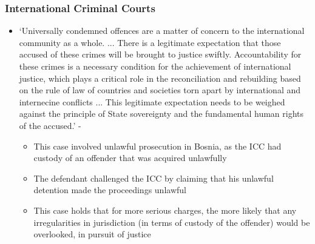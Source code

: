 \subsubsection{International Criminal Courts}
\begin{itemize}
    \item `Universally condemned offences are a matter of concern to the international community as a whole. ... There is a legitimate expectation that those accused of these crimes will be brought to justice swiftly. Accountability for these crimes is a necessary condition for the achievement of international justice, which plays a critical role in the reconciliation and rebuilding based on the rule of law of countries and societies torn apart by international and internecine conflicts ... This legitimate expectation needs to be weighed against the principle of State sovereignty and the fundamental human rights of the accused.' - 
    \begin{itemize}
        \item This case involved unlawful prosecution in Bosnia, as the ICC had custody of an offender that was acquired unlawfully
        \item The defendant challenged the ICC by claiming that his unlawful detention made the proceedings unlawful
        \item This case holds that for more serious charges, the more likely that any irregularities in jurisdiction (in terms of custody of the offender) would be overlooked, in pursuit of justice
    \end{itemize}
\end{itemize}